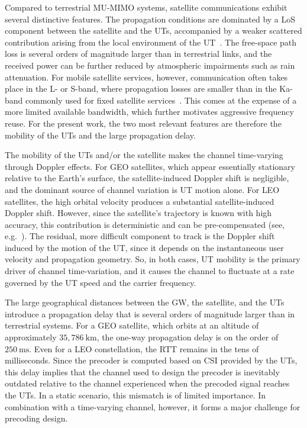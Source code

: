 Compared to terrestrial \ac{MU}-\ac{MIMO} systems, satellite communications exhibit several distinctive features. 
The propagation conditions are dominated by a \acf{LoS} component between the satellite and the \acp{UT}, accompanied by a weaker scattered contribution arising from the local environment of the \ac{UT}~\cite{4_mimo_over_satellite_review}.
The free-space path loss is several orders of magnitude larger than in terrestrial links, and the received power can be further reduced by atmospheric impairments such as rain attenuation.
For mobile satellite services, however, communication often takes place in the L- or S-band, where propagation losses are smaller than in the Ka-band commonly used for fixed satellite services~\cite{1_signal_processing_for_satellites}.
This comes at the expense of a more limited available bandwidth, which further motivates aggressive frequency reuse.
For the present work, the two most relevant features are therefore the mobility of the \acp{UT} and the large propagation delay.

The mobility of the \acp{UT} and/or the satellite makes the channel time-varying through Doppler effects.
For \ac{GEO} satellites, which appear essentially stationary relative to the Earth's surface, the satellite-induced Doppler shift is negligible, and the dominant source of channel variation is \ac{UT} motion alone.
For \ac{LEO} satellites, the high orbital velocity produces a substantial satellite-induced Doppler shift. 
However, since the satellite's trajectory is known with high accuracy, this contribution is deterministic and can be pre-compensated (see, e.g.~\cite{doppler_compensation_mimo_leo}).
The residual, more difficult component to track is the Doppler shift induced by the motion of the \ac{UT}, since it depends on the instantaneous user velocity and propagation geometry.
So, in both cases, \ac{UT} mobility is the primary driver of channel time-variation, and it causes the channel to fluctuate at a rate governed by the \ac{UT} speed and the carrier frequency.

The large geographical distances between the \ac{GW}, the satellite, and the \acp{UT} introduce a propagation delay that is several orders of magnitude larger than in terrestrial systems. 
For a \ac{GEO} satellite, which orbits at an altitude of approximately $35{,}786~\mathrm{km}$, the one-way propagation delay is on the order of $250~\mathrm{ms}$.
Even for a \ac{LEO} constellation, the \ac{RTT} remains in the tens of milliseconds.
Since the precoder is computed based on \ac{CSI} provided by the \acp{UT}, this delay implies that the channel used to design the precoder is inevitably outdated relative to the channel experienced when the precoded signal reaches the \acp{UT}.
In a static scenario, this mismatch is of limited importance.
In combination with a time-varying channel, however, it forms a major challenge for precoding design.


